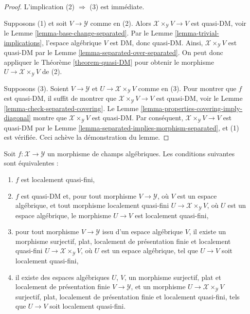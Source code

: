 \begin{proof}
L'implication (2) $\Rightarrow$ (3) est immédiate.

\medskip\noindent
Supposons (1) et soit $V \to \mathcal{Y}$ comme en (2). Alors
$\mathcal{X} \times_\mathcal{Y} V \to V$ est quasi-DM, voir le
Lemme \ref{lemma-base-change-separated}.
Par le Lemme \ref{lemma-trivial-implications}, l'espace algébrique $V$ est DM,
donc quasi-DM. Ainsi, $\mathcal{X} \times_\mathcal{Y} V$ est quasi-DM par le
Lemme \ref{lemma-separated-over-separated}.
On peut donc appliquer le Théorème \ref{theorem-quasi-DM} pour obtenir le
morphisme $U \to \mathcal{X} \times_\mathcal{Y} V$ de (2).

\medskip\noindent
Supposons (3). Soient $V \to \mathcal{Y}$ et
$U \to \mathcal{X} \times_\mathcal{Y} V$ comme en (3).
Pour montrer que $f$ est quasi-DM, il suffit de montrer que
$\mathcal{X} \times_\mathcal{Y} V \to V$ est quasi-DM, voir le
Lemme \ref{lemma-check-separated-covering}.
Le Lemme \ref{lemma-properties-covering-imply-diagonal} montre que
$\mathcal{X} \times_\mathcal{Y} V$ est quasi-DM.
Par conséquent, $\mathcal{X} \times_\mathcal{Y} V \to V$ est quasi-DM par
le Lemme \ref{lemma-separated-implies-morphism-separated}, et (1) est
vérifiée. Ceci achève la démonstration du lemme.
\end{proof}

\begin{lemma}
\label{lemma-characterize-locally-quasi-finite}
Soit $f : \mathcal{X} \to \mathcal{Y}$ un morphisme de champs algébriques.
Les conditions suivantes sont équivalentes :
\begin{enumerate}
\item $f$ est localement quasi-fini,
\item $f$ est quasi-DM et, pour tout morphisme $V \to \mathcal{Y}$, où
$V$ est un espace algébrique, et tout morphisme localement quasi-fini
$U \to \mathcal{X} \times_\mathcal{Y} V$, où $U$ est un espace algébrique,
le morphisme $U \to V$ est localement quasi-fini,
\item pour tout morphisme $V \to \mathcal{Y}$ issu d'un espace algébrique
$V$, il existe un morphisme surjectif, plat, localement de présentation finie
et localement quasi-fini $U \to \mathcal{X} \times_\mathcal{Y} V$, où
$U$ est un espace algébrique, tel que $U \to V$ soit localement quasi-fini,
\item il existe des espaces algébriques $U$, $V$, un morphisme surjectif,
plat et localement de présentation finie $V \to \mathcal{Y}$, et un morphisme
$U \to \mathcal{X} \times_\mathcal{Y} V$ surjectif, plat, localement de
présentation finie et localement quasi-fini, tels que $U \to V$ soit
localement quasi-fini.
\end{enumerate}
\end{lemma}

